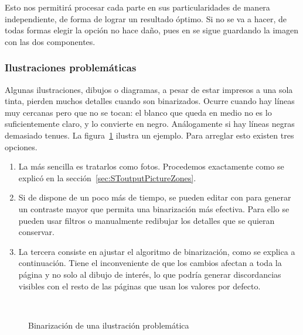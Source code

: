 \documentclass[%
	a5paper,
	10pt,
	twoside,
	openright,
	final,
]{memoir}
\begin{document}
	Esto nos permitirá procesar cada parte en sus particularidades de manera independiente, de forma de lograr un resultado óptimo. Si no se va a hacer, de todas formas elegir la opción no hace daño, pues en  se sigue guardando la imagen con las dos componentes.

	\subsubsection{Ilustraciones problemáticas} Algunas ilustraciones, dibujos o diagramas, a pesar de estar impresos a una sola tinta, pierden muchos detalles cuando son binarizados. Ocurre cuando hay líneas muy cercanas pero que no se tocan: el blanco que queda en medio no es lo suficientemente claro, y \scantailor lo convierte en negro. Análogamente si hay líneas negras demasiado tenues. La figura~\ref{fig:SToutputBadDiagrams} ilustra un ejemplo. Para arreglar esto existen tres opciones.

	\begin{enumerate}[noitemsep]
		\item La más sencilla es tratarlos como fotos. Procedemos exactamente como se explicó en la sección~\ref{sec:SToutputPictureZones}.
		\item Si de dispone de un poco más de tiempo, se pueden editar con \gimp para generar un contraste mayor que permita una binarización más efectiva. Para ello se pueden usar filtros o manualmente redibujar los detalles que se quieran conservar.
		\item La tercera consiste en ajustar el algoritmo de binarización, como se explica a continuación. Tiene el inconveniente de que los cambios afectan a toda la página y no solo al dibujo de interés, lo que podría generar discordancias visibles con el resto de las páginas que usan los valores por defecto.
	\end{enumerate}

	\begin{figure}
		\hspace*{\fill}
		\hfill
		\hspace*{\fill}\\
		\hspace*{\fill}
		\hfill
		\hspace*{\fill}
		\caption{Binarización de una ilustración problemática\label{fig:SToutputBadDiagrams}}
	\end{figure}
\end{document}
